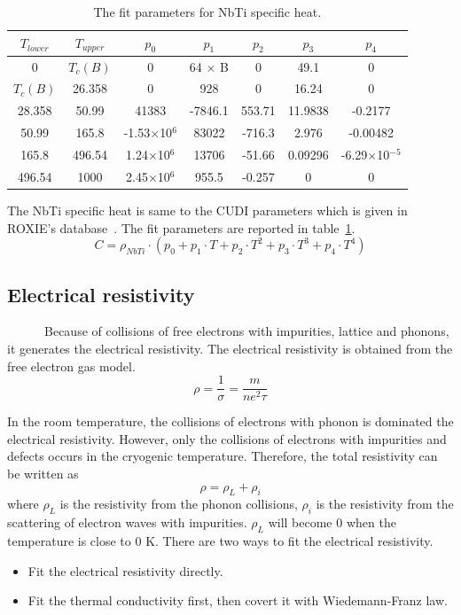 \begin{table}[H]
 \centering
 \begin{tabular}{ccccccc} \hline \hline
 $T_{lower}$ & $T_{upper}$ & $p_0$ & $p_1$ & $p_2$ & $p_3$ & $p_4$ \\ \hline
 0 & $T_c(B)$ & 0 & 64 $\times$ B & 0 & 49.1 & 0 \\
 $T_c(B)$ & 26.358 & 0 & 928 & 0 & 16.24 & 0 \\
 28.358 & 50.99 & 41383 & -7846.1 & 553.71 & 11.9838 & -0.2177 \\
 50.99 & 165.8 & -1.53$\times$10$^6$ & 83022 & -716.3 & 2.976 & -0.00482 \\
 165.8 & 496.54 & 1.24$\times$10$^6$ & 13706 & -51.66 & 0.09296 & -6.29$\times$10$^{-5}$ \\
 496.54 & 1000 & 2.45$\times$10$^6$ & 955.5 & -0.257 & 0 & 0 \\ \hline \hline
 \end{tabular}
 \caption{The fit parameters for NbTi specific heat.}
 \label{nbtish}
\end{table}
The NbTi specific heat is same to the CUDI parameters which is given in ROXIE's database~\cite{roxie}.
The fit parameters are reported in table~\ref{nbtish}.
\begin{equation}
 C = \rho_{NbTi}\cdot (p_0 + p_1 \cdot T + p_2 \cdot T^2 + p_3 \cdot T^3 + p_4 \cdot T^4)
\end{equation}

  \subsection{Electrical resistivity}
~~~~~~Because of collisions of free electrons with impurities, lattice and phonons, it generates the electrical resistivity.
The electrical resistivity is obtained from the free electron gas model.
\begin{equation}
 \rho = \frac{1}{\sigma} = \frac{m}{ne^2\tau}
\end{equation}

In the room temperature, the collisions of electrons with phonon is dominated the electrical resistivity.
However, only the collisions of electrons with impurities and defects occurs in the cryogenic temperature.
Therefore, the total resistivity can be written as
\begin{equation}
 \rho = \rho_L + \rho_i
\label{reseq}
\end{equation}
where $\rho_L$ is the resistivity from the phonon collisions, $\rho_i$ is the resistivity from the scattering of electron waves with impurities.
$\rho_L$ will become 0 when the temperature is close to 0 K.
There are two ways to fit the electrical resistivity.
\begin{itemize}
 \setlength{\itemsep}{-5pt}
 \item Fit the electrical resistivity directly.
 \item Fit the thermal conductivity first, then covert it with Wiedemann-Franz law.
\end{itemize}

